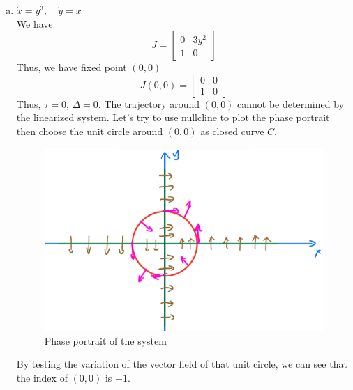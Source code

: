 \documentclass[12pt]{exam}
\begin{document}
\begin{enumerate}[(a)]
	\item $\dot{x} = y^3, \quad \dot{y}=x$ \\
		We have
		\[ J = \begin{bmatrix} 0 & 3y^2 \\ 1 & 0 \end{bmatrix} \]
		Thus, we have fixed point $(0, 0)$
		\[ J(0, 0) = \begin{bmatrix} 0 & 0 \\ 1 & 0 \end{bmatrix} \]
		Thus, $\tau = 0$, $\Delta = 0$. The trajectory around $(0, 0)$ cannot be determined by the linearized system. Let's try to use nullcline to plot the phase portrait then choose the unit circle around $(0, 0)$ as closed curve $C$. 
		\begin{figure}[H]
			\centering
			\includegraphics[width=0.7\linewidth]{3b.jpeg}
			\caption{Phase portrait of the system}
		\end{figure}
		By testing the variation of the vector field of that unit circle, we can see that the index of $(0, 0)$ is $-1$.
		


\end{enumerate}
\end{document}
